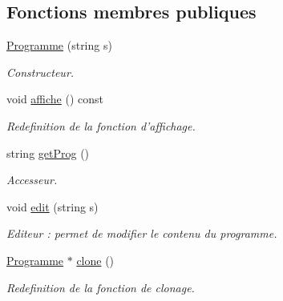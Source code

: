 \subsection*{Fonctions membres publiques}
\begin{CompactItemize}
\item 
\hyperlink{class_programme_714382be5455a92d17099406517df95f}{Programme} (string s)
\begin{CompactList}\small\item\em Constructeur. \item\end{CompactList}\item 
\hypertarget{class_programme_8a4a4047620cf9bf7b6682e4a8c0b850}{
void \hyperlink{class_programme_8a4a4047620cf9bf7b6682e4a8c0b850}{affiche} () const }
\label{class_programme_8a4a4047620cf9bf7b6682e4a8c0b850}

\begin{CompactList}\small\item\em Redefinition de la fonction d'affichage. \item\end{CompactList}\item 
string \hyperlink{class_programme_640770a1987a79ee81c985966254a959}{getProg} ()
\begin{CompactList}\small\item\em Accesseur. \item\end{CompactList}\item 
void \hyperlink{class_programme_db3fc4dc8b2751b3775a53fa245606d2}{edit} (string s)
\begin{CompactList}\small\item\em Editeur : permet de modifier le contenu du programme. \item\end{CompactList}\item 
\hypertarget{class_programme_df42f9872a754beefe020294f585f9a6}{
\hyperlink{class_programme}{Programme} $\ast$ \hyperlink{class_programme_df42f9872a754beefe020294f585f9a6}{clone} ()}
\label{class_programme_df42f9872a754beefe020294f585f9a6}

\begin{CompactList}\small\item\em Redefinition de la fonction de clonage. \item\end{CompactList}\end{CompactItemize}


